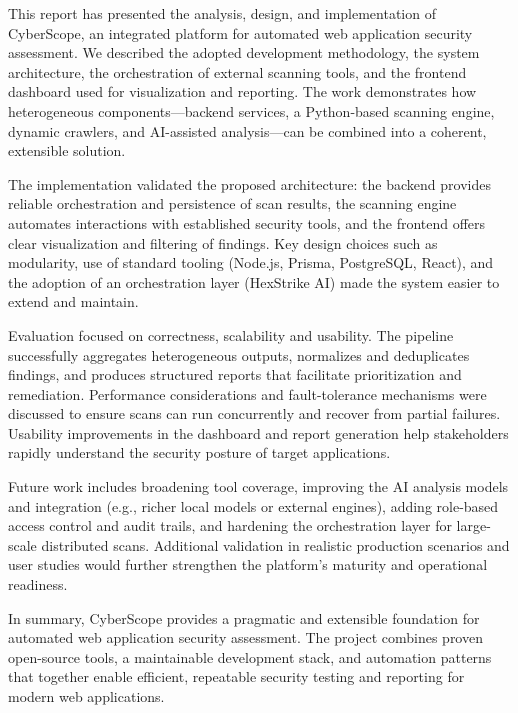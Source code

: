This report has presented the analysis, design, and implementation of CyberScope, an integrated platform for automated web application security assessment. We described the adopted development methodology, the system architecture, the orchestration of external scanning tools, and the frontend dashboard used for visualization and reporting. The work demonstrates how heterogeneous components—backend services, a Python-based scanning engine, dynamic crawlers, and AI-assisted analysis—can be combined into a coherent, extensible solution.

The implementation validated the proposed architecture: the backend provides reliable orchestration and persistence of scan results, the scanning engine automates interactions with established security tools, and the frontend offers clear visualization and filtering of findings. Key design choices such as modularity, use of standard tooling (Node.js, Prisma, PostgreSQL, React), and the adoption of an orchestration layer (HexStrike AI) made the system easier to extend and maintain.

Evaluation focused on correctness, scalability and usability. The pipeline successfully aggregates heterogeneous outputs, normalizes and deduplicates findings, and produces structured reports that facilitate prioritization and remediation. Performance considerations and fault-tolerance mechanisms were discussed to ensure scans can run concurrently and recover from partial failures. Usability improvements in the dashboard and report generation help stakeholders rapidly understand the security posture of target applications.

Future work includes broadening tool coverage, improving the AI analysis models and integration (e.g., richer local models or external engines), adding role-based access control and audit trails, and hardening the orchestration layer for large-scale distributed scans. Additional validation in realistic production scenarios and user studies would further strengthen the platform's maturity and operational readiness.

In summary, CyberScope provides a pragmatic and extensible foundation for automated web application security assessment. The project combines proven open-source tools, a maintainable development stack, and automation patterns that together enable efficient, repeatable security testing and reporting for modern web applications.